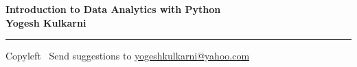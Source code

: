 
\graphicspath{{images/}}

\footnotesize


\begin{center}
\Large{\textbf{Introduction to Data Analytics with Python\\ Yogesh Kulkarni}}  
\end{center}

\begin{multicols}{2}

\end{multicols}

\rule{\linewidth}{0.25pt}
\scriptsize
Copyleft \textcopyleft\  Send suggestions to 
\href{http://www.yogeshkulkarni.com}{yogeshkulkarni@yahoo.com}


